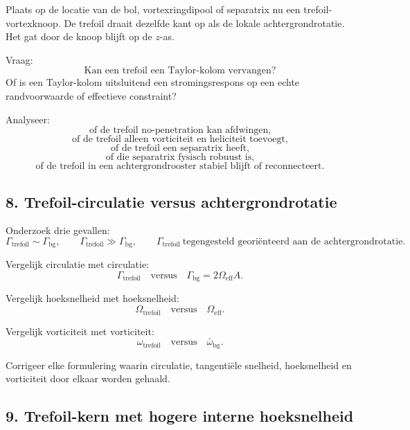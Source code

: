 \documentclass[11pt]{article}
\begin{document}
        Plaats op de locatie van de bol, vortexringdipool of separatrix nu een trefoil-vortexknoop. De trefoil draait dezelfde kant op als de lokale achtergrondrotatie. Het gat door de knoop blijft op de \(z\)-as.
        
        Vraag:
        \[
            \text{Kan een trefoil een Taylor-kolom vervangen?}
        \]
        Of is een Taylor-kolom uitsluitend een stromingsrespons op een echte randvoorwaarde of effectieve constraint?
        
        Analyseer:
        \[
            \text{of de trefoil no-penetration kan afdwingen,}
        \]
        \[
            \text{of de trefoil alleen vorticiteit en heliciteit toevoegt,}
        \]
        \[
            \text{of de trefoil een separatrix heeft,}
        \]
        \[
            \text{of die separatrix fysisch robuust is,}
        \]
        \[
            \text{of de trefoil in een achtergrondrooster stabiel blijft of reconnecteert.}
        \]
    
    \subsection{8. Trefoil-circulatie versus achtergrondrotatie}
        
        Onderzoek drie gevallen:
        \[
            \Gamma_{\mathrm{trefoil}}\sim\Gamma_{\mathrm{bg}},
            \qquad
            \Gamma_{\mathrm{trefoil}}\gg\Gamma_{\mathrm{bg}},
            \qquad
            \Gamma_{\mathrm{trefoil}}\ \text{tegengesteld georiënteerd aan de achtergrondrotatie}.
        \]
        
        Vergelijk circulatie met circulatie:
        \[
            \Gamma_{\mathrm{trefoil}}
            \quad\text{versus}\quad
            \Gamma_{\mathrm{bg}}=2\Omega_{\mathrm{eff}}A.
        \]
        
        Vergelijk hoeksnelheid met hoeksnelheid:
        \[
            \Omega_{\mathrm{trefoil}}
            \quad\text{versus}\quad
            \Omega_{\mathrm{eff}}.
        \]
        
        Vergelijk vorticiteit met vorticiteit:
        \[
            \omega_{\mathrm{trefoil}}
            \quad\text{versus}\quad
            \bar{\omega}_{\mathrm{bg}}.
        \]
        
        Corrigeer elke formulering waarin circulatie, tangentiële snelheid, hoeksnelheid en vorticiteit door elkaar worden gehaald.
    
    \subsection{9. Trefoil-kern met hogere interne hoeksnelheid}
        
\end{document}
